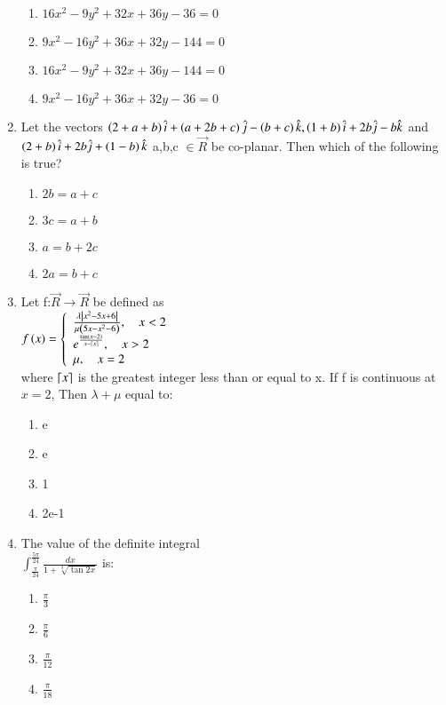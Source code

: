 \documentclass[journal,12pt,onecolumn]{IEEEtran}
\theoremstyle{remark}
\begin{document}
\begin{enumerate}
    \begin{enumerate}
        \item $16x^2-9y^2+32x+36y-36=0$
        \item $9x^2-16y^2+36x+32y-144=0$
        \item $16x^2-9y^2+32x+36y-144=0$
        \item $9x^2-16y^2+36x+32y-36=0$
    \end{enumerate}
\item Let the vectors $\left(2+a+b\right)\hat{i}+\left(a+2b+c\right)\hat{j}-\left(b+c\right)\hat{k},\left(1+b\right)\hat{i}+2b\hat{j}-b\hat{k}$ and $\left(2+b\right)\hat{i}+2b\hat{j}+\left(1-b\right)\hat{k}$ a,b,c $\in \vec{R}$ be co-planar. Then which of the following is true?
\begin{enumerate}
    \item $2b=a+c$
    \item $3c=a+b$
    \item $a=b+2c$
    \item $2a=b+c$
\end{enumerate}
\item Let f:$\vec{R}\rightarrow\vec{R}$ be defined as \\
$f\left(x\right)=\left\{ \begin{array}{ll} \frac{\lambda\left\vert x^2-5x+6\right\vert}{\mu\left(5x-x^2-6\right)}, \quad x < 2 \\ e^{\frac{\tan\left(x-2\right)}{x-\left \lceil x \right \rceil}}, \quad x>2 \\ \mu, \quad x=2 \end{array} \right. $\\
where $\left \lceil x \right \rceil$ is the greatest integer less than or equal to x. If f is continuous at $x=2$, Then $\lambda + \mu$ equal to:
\begin{enumerate}
    \item e
    \item e
    \item 1
    \item 2e-1
\end{enumerate}
\item The value of the definite integral\\
$\int_{\frac{\pi}{24}}^{\frac{5\pi}{24}} \frac{dx}{1+\sqrt[3]{\tan2x}}$ is:
\begin{enumerate}
    \item $\frac{\pi}{3}$
    \item $\frac{\pi}{6}$
    \item $\frac{\pi}{12}$
    \item $\frac{\pi}{18}$

\end{enumerate}
\end{enumerate}
\end{document}
